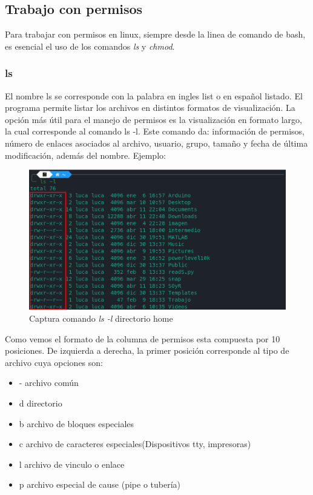 \documentclass[12pt,a4paper]{article} %
\begin{document}
	\subsection{Trabajo con permisos}
	Para trabajar con permisos en linux, siempre desde la linea de comando de bash, es esencial el uso de los comandos \textit{ls} y \textit{chmod}.
	\subsubsection{ls}
	El nombre ls se corresponde con la palabra en ingles list o en español listado. El programa permite listar los archivos en distintos formatos de visualización. La opción más útil para el manejo de permisos es la visualización en formato largo, la cual corresponde al comando ls -l.  Este comando da: información de permisos, número de enlaces asociados al archivo, usuario, grupo, tamaño y fecha de última modificación, además del nombre. Ejemplo:\par
	\begin{figure}[h]
		\includegraphics[scale=1]{ls_capture}
		\caption{Captura comando \textit{ls -l} directorio home}
	\end{figure}
	Como vemos el formato de la columna de permisos esta compuesta por 10 posiciones. De izquierda a derecha, la primer posición corresponde al tipo de archivo cuya opciones son:
	\begin{itemize}
		\item - archivo común
		\item d directorio
		\item b archivo de bloques especiales
		\item c archivo de caracteres especiales(Dispositivos tty, impresoras)
		\item l archivo de vinculo o enlace
		\item p archivo especial de cause (pipe o tubería)
	\end{itemize}
\end{document}
